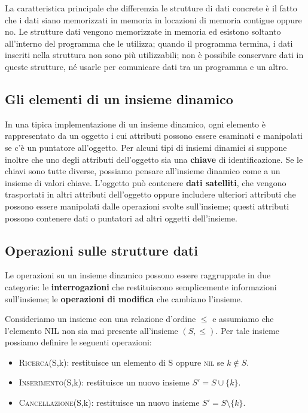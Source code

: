 La caratteristica principale che differenzia le strutture di dati concrete è il fatto che i dati siano memorizzati in memoria in locazioni di memoria contigue oppure no. Le strutture dati vengono memorizzate in memoria ed esistono soltanto all'interno del programma che le utilizza; quando il programma termina, i dati inseriti nella struttura non sono più utilizzabili; non è possibile conservare dati in queste strutture, né usarle per comunicare dati tra un programma e un altro.

\subsection{Gli elementi di un insieme dinamico}
In una tipica implementazione di un insieme dinamico, ogni elemento è rappresentato da un oggetto i cui attributi possono essere esaminati e manipolati se c'è un puntatore all'oggetto. Per alcuni tipi di insiemi dinamici si suppone inoltre che uno degli attributi dell'oggetto sia una \textbf{chiave} di identificazione. Se le chiavi sono tutte diverse, possiamo pensare all'insieme dinamico come a un insieme di valori chiave. L'oggetto può contenere \textbf{dati satelliti}, che vengono trasportati in altri attributi dell'oggetto oppure includere ulteriori attributi che possono essere manipolati dalle operazioni svolte sull'insieme; questi attributi possono contenere dati o puntatori ad altri oggetti dell'insieme.

\subsection{Operazioni sulle strutture dati}
Le operazioni su un insieme dinamico possono essere raggruppate in due categorie: le \textbf{interrogazioni} che restituiscono semplicemente informazioni sull'insieme; le \textbf{operazioni di modifica} che cambiano l'insieme.

Consideriamo un insieme con una relazione d'ordine $\leq$ e assumiamo che l'elemento \textsc{NIL} non sia mai presente all'insieme $(S, \leq)$. Per tale insieme possiamo definire le seguenti operazioni:

\begin{itemize}
	\item \textsc{Ricerca}(S,k): restituisce un elemento di S oppure \textsc{nil} se $k \notin S$.
	\item \textsc{Inserimento}(S,k): restituisce un nuovo insieme $S' = S \cup \{k\}$.
	\item \textsc{Cancellazione}(S,k): restituisce un nuovo insieme $S' = S \setminus \{k\}$.
\end{itemize}

